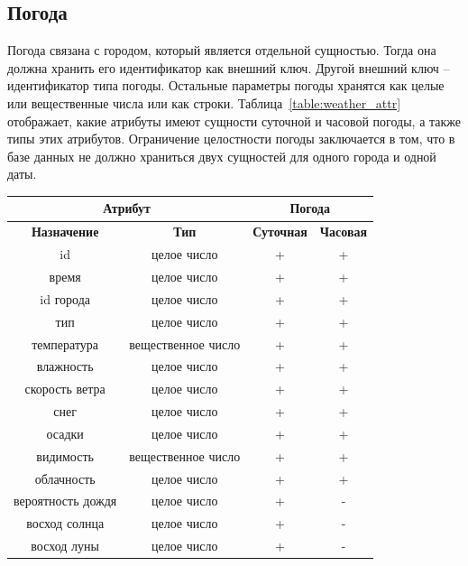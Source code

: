 \subsection*{Погода}
Погода связана с городом, который является отдельной сущностью.
Тогда она должна хранить его идентификатор как внешний ключ.
Другой внешний ключ -- идентификатор типа погоды.
Остальные параметры погоды хранятся как целые или вещественные числа или как строки.
Таблица~\ref{table:weather_attr} отображает, какие атрибуты имеют сущности суточной и часовой погоды, а также типы этих атрибутов.
Ограничение целостности погоды заключается в том, что в базе данных не должно храниться двух сущностей для одного города и одной даты.

\begin{table}[H]
    \centering
    \begin{tabular}{ |c|c|c|c| }
        \hline
        \multicolumn{2}{|c|}{Атрибут} & \multicolumn{2}{|c|}{Погода}  \\
        \hline
            \textbf{Назначение} & \textbf{Тип} & \textbf{Суточная} & \textbf{Часовая} \\
        \hline
            id & целое число & + & + \\
        \hline
            время & целое число & + & + \\
        \hline
            id города & целое число & + & + \\
        \hline
            тип & целое число & + & + \\
        \hline
            температура & вещественное число & + & + \\
        \hline
            влажность & целое число & + & + \\
        \hline
            скорость ветра & целое число & + & + \\
        \hline
             снег & целое число & + & + \\
        \hline
             осадки & целое число & + & + \\
        \hline
             видимость & вещественное число & + & + \\
        \hline
             облачность & целое число & + & + \\
        \hline
             вероятность дождя & целое число & + & - \\
        \hline
             восход солнца & целое число & + & - \\
        \hline
             восход луны & целое число & + & - \\

\end{tabular}
\end{table}
